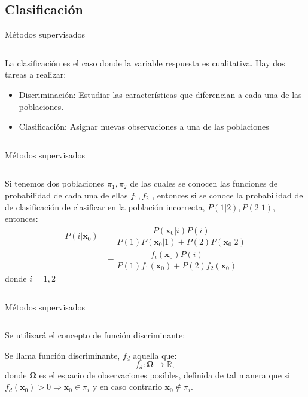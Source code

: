 \subsection{Clasificación}
\begin{frame}{Métodos supervisados}
\begin{columns}
\begin{column}{0.9\textwidth}
La clasificación es el caso donde la variable respuesta es cualitativa. 
Hay dos tareas a realizar:
\begin{itemize}
 \item Discriminación: Estudiar las características que diferencian a cada una de las poblaciones. 
 \item Clasificación: Asignar nuevas observaciones a una de las poblaciones 
\end{itemize}
\end{column}
\end{columns}
\end{frame}


\begin{frame}{Métodos supervisados}
\begin{columns}
\begin{column}{0.9\textwidth}
Si tenemos dos poblaciones $\pi_1, \pi_2$ de las cuales se conocen las funciones de probabilidad de cada una de ellas $f_1,f_2$ , entonces si se conoce la probabilidad de de clasificación de clasificar en la población incorrecta, $P(1|2), P(2|1)$, entonces: 
\begin{equation}
\begin{split}
P(i|\textbf{x}_0)&=\dfrac{P(\textbf{x}_0|i)P(i)}{P(1)P(\textbf{x}_0|1)+P(2)P(\textbf{x}_0|2)}\\&=\dfrac{f_i(\mathbf{x}_0)P(i)}{P(1)f_1(\mathbf{x}_0)+P(2)f_2(\mathbf{x}_0)}
\end{split}
\end{equation}
donde $i=1,2$
\end{column}
\end{columns}
\end{frame}

\begin{frame}{Métodos supervisados}
\begin{columns}
\begin{column}{0.9\textwidth}
Se utilizará el concepto de función discriminante: 
\begin{defi}
Se llama función discriminante, $f_{d}$ aquella que:
\begin{equation}
f_{d}:\mathbf{\Omega}\longrightarrow \mathbb{R},
\end{equation}
donde $\mathbf{\Omega}$ es el espacio de observaciones posibles, definida de tal manera que si $f_{d}(\textbf{x}_0)>0\Rightarrow \textbf{x}_0\in \pi_i$ y en caso contrario $\textbf{x}_0\notin \pi_i$. 
\end{defi}
\end{column}
\end{columns}
\end{frame}

